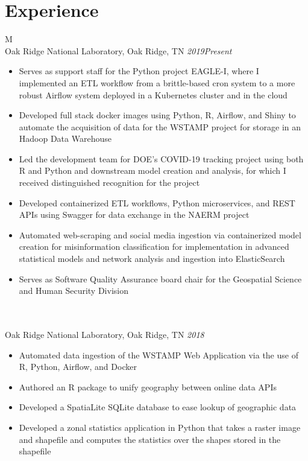 \documentclass[10pt]{article}%
\begin{document}
\section*{\faCalendar{} Experience}
   \begin{tabularx}{\linewidth}{M}%
       \\
      Oak Ridge National Laboratory, Oak Ridge, TN \textit{2019\textemdash Present} \\
      \begin{itemize}[topsep=-12pt,parsep=0em]
          \setlength\itemsep{0em}
          \item Serves as support staff for the Python project EAGLE-I, where I implemented an ETL workflow from a brittle-based cron system to a more robust Airflow system deployed in a Kubernetes cluster and in the cloud %
          \item Developed full stack docker images using Python, R, Airflow,  and Shiny to automate the acquisition of data for the WSTAMP project for storage in an Hadoop Data Warehouse %
          \item Led the development team for DOE's COVID-19 tracking project using both R and Python and downstream model creation and analysis, for which I received distinguished recognition for the project %
          \item Developed containerized ETL workflows, Python microservices, and REST APIs using Swagger for data exchange in the NAERM project %
          \item Automated web-scraping and social media ingestion via containerized model creation for misinformation classification for implementation in advanced statistical models and network analysis and ingestion into ElasticSearch %
          \item Serves as Software Quality Assurance board chair for the Geospatial Science and Human Security Division %
      \end{itemize} \\
            \\
      Oak Ridge National Laboratory, Oak Ridge, TN \textit{2018 } \\
      \begin{itemize}[topsep=-12pt,parsep=0em]
          \setlength\itemsep{0em}
          \item Automated data ingestion of the WSTAMP Web Application via the use of R, Python, Airflow, and Docker %
          \item Authored an R package to unify geography between online data APIs %
          \item Developed a SpatiaLite SQLite database to ease lookup of geographic data %
          \item Developed a zonal statistics application in Python that takes a raster image and shapefile and computes the statistics over the shapes stored in the shapefile %
        \end{itemize} \\
   \end{tabularx}
\end{document}
